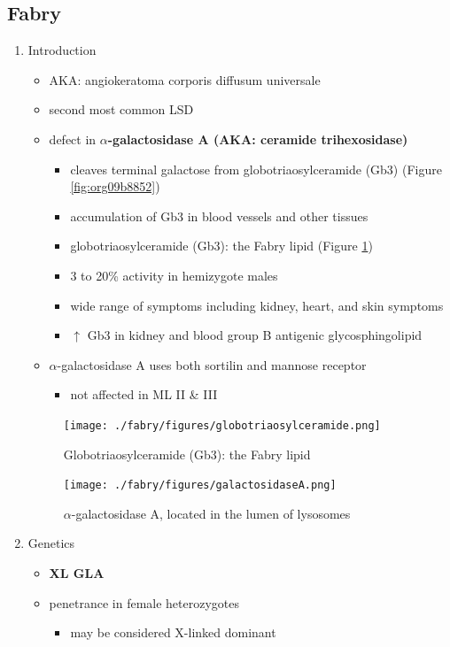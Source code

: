 \documentclass{scrartcl}
\begin{document}
\subsection{Fabry}
\label{sec:orgf8c3601}
\begin{enumerate}
\item Introduction
\label{sec:org28e419d}
\begin{itemize}
\item AKA: angiokeratoma corporis diffusum universale
\item second most common LSD
\item defect in \textbf{\(\alpha\)-galactosidase A (AKA: ceramide trihexosidase)}
\begin{itemize}
\item cleaves terminal galactose from globotriaosylceramide (Gb3)
(Figure \ref{fig:org09b8852})
\item accumulation of Gb3 in blood vessels and other tissues
\item globotriaosylceramide (Gb3): the Fabry lipid (Figure \ref{fig:org6bde026})
\item 3 to 20\% activity in hemizygote males
\item wide range of symptoms including kidney, heart, and skin symptoms
\item \(\uparrow\) Gb3 in kidney and blood group B antigenic glycosphingolipid
\end{itemize}
\item \(\alpha\)-galactosidase A uses both sortilin and mannose receptor
\begin{itemize}
\item not affected in ML II \& III
\end{itemize}
\end{itemize}

\begin{figure}[htbp]
\centering
\texttt{[image: ./fabry/figures/globotriaosylceramide.png]}
\caption[Globotriaosylceramide]{\label{fig:org6bde026}
Globotriaosylceramide (Gb3): the Fabry lipid}
\end{figure}

\begin{figure}[htbp]
\centering
\texttt{[image: ./fabry/figures/galactosidaseA.png]}
\caption[\(\alpha\)-galactosidase A]{\label{fig:org95f8628}
\(\alpha\)-galactosidase A, located in the lumen of lysosomes}
\end{figure}

\item Genetics
\label{sec:orgd9c1803}
\begin{itemize}
\item \textbf{XL GLA}
\item penetrance in female heterozygotes
\begin{itemize}
\item may be considered X-linked dominant
\end{itemize}
\end{itemize}


\end{enumerate}
\end{document}
